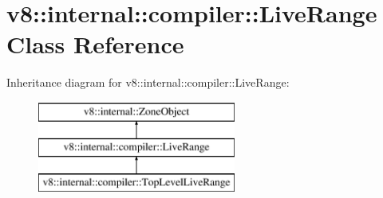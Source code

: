 \hypertarget{classv8_1_1internal_1_1compiler_1_1_live_range}{}\section{v8\+:\+:internal\+:\+:compiler\+:\+:Live\+Range Class Reference}
\label{classv8_1_1internal_1_1compiler_1_1_live_range}
Inheritance diagram for v8\+:\+:internal\+:\+:compiler\+:\+:Live\+Range\+:\begin{figure}[H]
\begin{center}
\leavevmode
\includegraphics[height=3.000000cm]{classv8_1_1internal_1_1compiler_1_1_live_range}
\end{center}
\end{figure}
